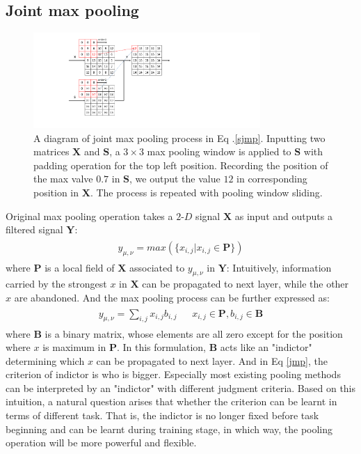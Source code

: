 \documentclass[10pt,twocolumn,letterpaper]{article}
\begin{document}
\subsection{Joint max pooling}
\begin{figure}[t]
\begin{center}
\includegraphics[width=3.4in]{Fig3.pdf}
\end{center}
   \caption{A diagram of joint max pooling process in Eq .\ref{sjmp}.
   Inputting two matrices $\mathbf{X}$ and $\mathbf{S}$, a $3\times3$ max pooling window is applied to $\mathbf{S}$ with padding operation for the top left position.
   Recording the position of the max valve $0.7$ in $\mathbf{S}$, we output the value $12$ in corresponding position in $\mathbf{X}$.
   The process is repeated with pooling window sliding.}
\label{F3}
\end{figure}
Original max pooling operation takes a $2$-$D$ signal $\mathbf{X}$ as input and outputs a filtered signal $\mathbf{Y}$:
\begin{eqnarray}\label{mp}
\begin{aligned}
y_{\mu,\nu} = max(\{x_{i,j}|x_{i,j}\in \mathbf{P}\})
\end{aligned}
\end{eqnarray}
where $\mathbf{P}$ is a local field of $\mathbf{X}$ associated to $y_{\mu,\nu}$ in $\mathbf{Y}$:
Intuitively, information carried by the strongest $x$ in $\mathbf{X}$ can be propagated to next layer, while the other $x$ are abandoned.
And the max pooling process can be further expressed as:
\begin{eqnarray}\label{jmp}
\begin{aligned}
y_{\mu,\nu} = \sum_{i,j}x_{i,j}b_{i,j}~~~~~~~x_{i,j}\in \mathbf{P},b_{i,j}\in \mathbf{B}
\end{aligned}
\end{eqnarray}
where $\mathbf{B}$ is a binary matrix, whose elements are all zero except for the position where $x$ is maximum in $\mathbf{P}$.
In this formulation, $\mathbf{B}$ acts like an "indictor" determining which $x$ can be propagated to next layer.
And in Eq \ref{jmp}, the criterion of indictor is who is bigger.
Especially most existing pooling methods can be interpreted by an "indictor" with different judgment criteria.
Based on this intuition, a natural question arises that whether the criterion can be learnt in terms of different task.
That is, the indictor is no longer fixed before task beginning and can be learnt during training stage, in which way, the pooling operation will be more powerful and flexible.
\end{document}
